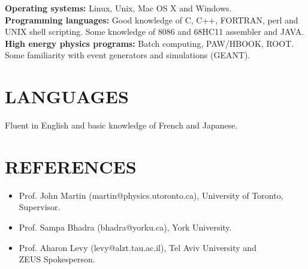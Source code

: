 \documentclass[margin]{res}
\begin{document}
\begin{resume}
\textbf{Operating systems:} Linux, Unix, Mac OS X and Windows.\\
\textbf{Programming languages:} Good knowledge of C, C++, FORTRAN, perl and UNIX shell scripting.  Some knowledge of 8086 and 68HC11 assembler and JAVA.\\
\textbf{High energy physics programs:} Batch computing, PAW/HBOOK, ROOT.  Some familiarity with event generators and simulations (GEANT).

\section{LANGUAGES}

Fluent in English and basic knowledge of French and Japanese.

\section{REFERENCES}
\begin{itemize}
  \item Prof. John Martin (martin@physics.utoronto.ca), University of Toronto,\\ Supervisor. 
  \item Prof. Sampa Bhadra (bhadra@yorku.ca), York University.
  \item Prof. Aharon Levy (levy@alzt.tau.ac.il), Tel Aviv University and \\ZEUS Spokesperson.
\end{itemize}
\end{resume} 
\end{document}
